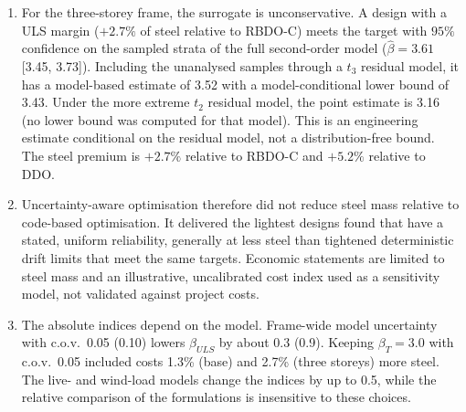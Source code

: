 \begin{enumerate}
heavier than DDO and 0--1.6\% heavier than RBDO-C. These bounds address Monte Carlo sampling
uncertainty only. Results close to the drift target remain sensitive to the $B_1$--$B_2$ approximation:
a 1\% drift bias makes the nine-storey design inconclusive. We recommend RBDO-C95 when a minimum
reliability is to be demonstrated, together with a check of systematic errors near the thresholds.
\item For the three-storey frame, the surrogate is unconservative. A design with a ULS margin
($+2.7\%$ of steel relative to RBDO-C) meets the target with $95\%$ confidence on the sampled strata of
the full second-order model ($\hat\beta=3.61$ [3.45, 3.73]). Including the unanalysed samples through a
$t_3$ residual model, it has a model-based estimate of 3.52 with a model-conditional lower bound of
3.43. Under the more extreme $t_2$ residual model, the point estimate is 3.16 (no lower bound
was computed for that model). This is an engineering estimate conditional on the residual model,
not a distribution-free bound. The steel premium is $+2.7\%$ relative to RBDO-C and $+5.2\%$
relative to DDO.
\item Uncertainty-aware optimisation therefore did not reduce steel mass relative to code-based
optimisation. It delivered the lightest designs found that have a stated, uniform reliability, generally at less
steel than tightened deterministic drift limits that meet the same targets. Economic statements are limited to
steel mass and an illustrative, uncalibrated cost index used as a sensitivity model, not validated
against project costs.
\item The absolute indices depend on the model. Frame-wide model uncertainty with c.o.v.\ 0.05 (0.10)
lowers $\beta_{ULS}$ by about 0.3 (0.9). Keeping $\beta_T=3.0$ with c.o.v.\ 0.05 included costs 1.3\%
(base) and 2.7\% (three storeys) more steel. The live- and wind-load models change the indices by up
to 0.5, while the relative comparison of the formulations is insensitive to these choices.
\end{enumerate}
